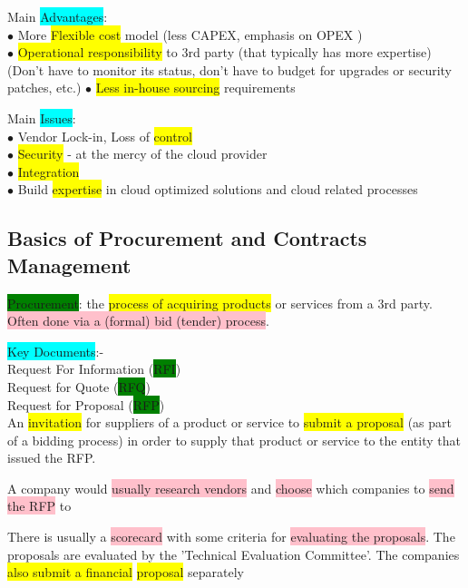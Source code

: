 \documentclass[]{project_plan}
\newcommand{\bulletPoint}{\hspace{-3.1pt}$\bullet$ \hspace{5pt}}
\begin{document}
Main \colorbox{cyan}{Advantages}:\\
\bulletPoint More \colorbox{yellow}{Flexible cost} model (less CAPEX, emphasis on OPEX )\\
\bulletPoint \colorbox{yellow}{Operational responsibility} to 3rd party (that typically has more expertise)\\
(Don't have to monitor its status, don't have to budget for upgrades or security patches, etc.)
\bulletPoint \colorbox{yellow}{Less in-house sourcing} requirements

Main \colorbox{cyan}{Issues}:\\
\bulletPoint Vendor Lock-in, Loss of \colorbox{yellow}{control}\\
\bulletPoint \colorbox{yellow}{Security} - at the mercy of the cloud provider\\
\bulletPoint \colorbox{yellow}{Integration}\\
\bulletPoint Build \colorbox{yellow}{expertise} in cloud optimized solutions and cloud related processes

\newpage

\subsection{Basics of Procurement and Contracts Management}
\colorbox{green}{Procurement}: the \colorbox{yellow}{process of acquiring products} or services from a 3rd party.\\
\colorbox{pink}{Often done via a (formal) bid (tender) process}.

\colorbox{cyan}{Key Documents}:-\\
Request For Information (\colorbox{green}{RFI})\\
Request for Quote (\colorbox{green}{RFQ})\\
Request for Proposal (\colorbox{green}{RFP})\\
An \colorbox{yellow}{invitation} for suppliers of a product or service to \colorbox{yellow}{submit a proposal} (as
part of a bidding process) in order to supply that product or service to
the entity that issued the RFP.

A company would \colorbox{pink}{usually research vendors} and \colorbox{pink}{choose} which companies to \colorbox{pink}{send the RFP} to

There is usually a \colorbox{pink}{scorecard} with some criteria for \colorbox{pink}{evaluating the proposals}. The proposals are evaluated by the 'Technical Evaluation Committee'.
The companies \colorbox{yellow}{also submit a financial} \colorbox{yellow}{proposal} separately
\end{document}
